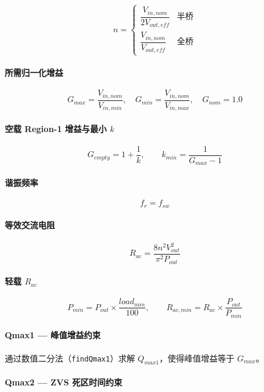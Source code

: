 \documentclass[UTF8]{ctexart}
\begin{document}
\[
n = \begin{cases}
\dfrac{V_{in,nom}}{2V_{out,eff}} & \text{半桥} \\[6pt]
\dfrac{V_{in,nom}}{V_{out,eff}} & \text{全桥}
\end{cases}
\]

\paragraph{所需归一化增益}

\[
G_{max} = \frac{V_{in,nom}}{V_{in,min}},\quad
G_{min} = \frac{V_{in,nom}}{V_{in,max}},\quad
G_{nom} = 1.0
\]

\paragraph{空载 Region-1 增益与最小 \(k\)}

\[
G_{empty} = 1 + \frac{1}{k},\qquad
k_{min} = \frac{1}{G_{max} - 1}
\]

\paragraph{谐振频率}

\[
f_r = f_{sw}
\]

\paragraph{等效交流电阻}

\[
R_{ac} = \frac{8 n^{2} V_{out}^{2}}{\pi^{2} P_{out}}
\]

\paragraph{轻载 \(R_{ac}\)}

\[
P_{min} = P_{out} \times \frac{load_{min}}{100},\qquad
R_{ac,min} = R_{ac} \times \frac{P_{out}}{P_{min}}
\]

\paragraph{Qmax1 — 峰值增益约束}

通过数值二分法（\texttt{findQmax1}）求解 \(Q_{max1}\)，使得峰值增益等于 \(G_{max}\)。

\paragraph{Qmax2 — ZVS 死区时间约束}
\end{document}
